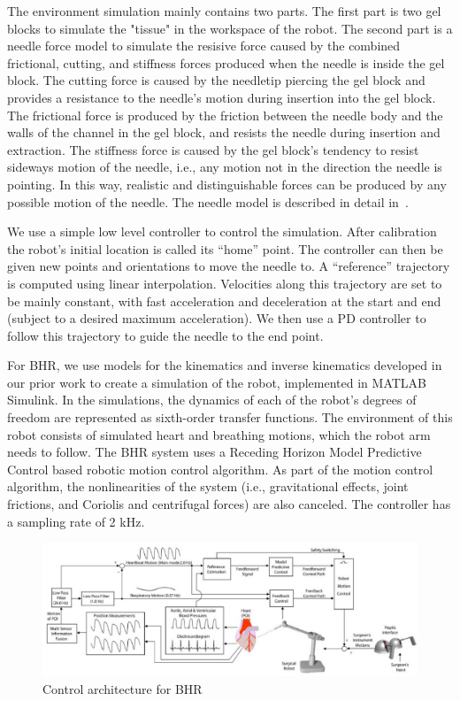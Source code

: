 The environment simulation mainly contains two parts. The first part is two gel blocks to simulate the "tissue" in the workspace of the robot.  The second part is a needle force model to simulate the resisive force caused by the combined frictional, cutting, and stiffness forces produced when the needle is inside the gel block. The cutting force is caused by the needletip piercing the gel block and provides a resistance to the needle’s motion during insertion into the gel block.  The frictional force is produced by the friction between the needle body and the walls of the channel in the gel block, and resists the needle during insertion and extraction. The stiffness force is caused by the gel block’s tendency to resist sideways motion of the needle, i.e., any motion not in the direction the needle is pointing. In this way, realistic and distinguishable forces can be produced by any possible motion of the needle. The needle model is described in detail in~\cite{Russell2012}.

We use a simple low level controller to control the simulation. After calibration the robot’s initial location is called its ``home'' point. The controller can then be given new points and orientations to move the needle to. A ``reference'' trajectory is computed using linear interpolation. Velocities along this trajectory are set to be mainly constant, with fast acceleration and deceleration at the start and end (subject to a desired maximum acceleration). We then use a PD controller to follow this trajectory to guide the needle to the end point.

For BHR, we use models for the kinematics and inverse kinematics developed in our prior work \cite{bebek2007whisker} to create a simulation of the robot, implemented in MATLAB Simulink. In the simulations, the dynamics of each of the robot’s degrees of freedom are represented as sixth-order transfer functions. The environment of this robot consists of simulated heart and breathing motions, which the robot arm needs to follow. The BHR system uses a Receding Horizon Model Predictive Control based robotic motion control algorithm. As part of the motion control algorithm, the nonlinearities of the system (i.e., gravitational effects, joint frictions, and Coriolis and centrifugal forces) are also canceled. The controller has a sampling rate of 2 kHz.

\begin{figure}[!thpb]
\centering
\includegraphics[width=\textwidth]{chapter5_BHR_control.pdf}
\caption{Control architecture for BHR}
\label{bhrcontrol}
\end{figure}

